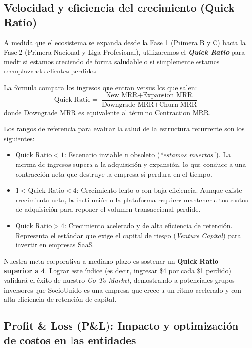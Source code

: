 \subsection{Velocidad y eficiencia del crecimiento (Quick Ratio)}

A medida que el ecosistema se expanda desde la Fase 1 (Primera B y C) hacia la Fase 2 (Primera Nacional y Liga Profesional), utilizaremos el \textbf{\textit{Quick Ratio}} para medir si estamos creciendo de forma saludable o si simplemente estamos reemplazando clientes perdidos.

La fórmula compara los ingresos que entran versus los que salen:
\begin{equation}
    \text{Quick Ratio} = \frac{\text{New MRR} + \text{Expansion MRR}}{\text{Downgrade MRR} + \text{Churn MRR}}
\end{equation}
donde $\text{Downgrade MRR}$ es equivalente al término $\text{Contraction MRR}$. 

Los rangos de referencia para evaluar la salud de la estructura recurrente son los siguientes:
\begin{itemize}
    \item $\text{Quick Ratio} < 1$: Escenario inviable u obsoleto (\textit{``estamos muertos''}). La merma de ingresos supera a la adquisición y expansión, lo que conduce a una contracción neta que destruye la empresa si perdura en el tiempo.
    \item $1 < \text{Quick Ratio} < 4$: Crecimiento lento o con baja eficiencia. Aunque existe crecimiento neto, la institución o la plataforma requiere mantener altos costos de adquisición para reponer el volumen transaccional perdido.
    \item $\text{Quick Ratio} > 4$: Crecimiento acelerado y de alta eficiencia de retención. Representa el estándar que exige el capital de riesgo (\textit{Venture Capital}) para invertir en empresas SaaS.
\end{itemize}
Nuestra meta corporativa a mediano plazo es sostener un \textbf{Quick Ratio superior a 4}. Lograr este índice (es decir, ingresar \$4 por cada \$1 perdido) validará el éxito de nuestro \textit{Go-To-Market}, demostrando a potenciales grupos inversores que SocioUnido es una empresa que crece a un ritmo acelerado y con alta eficiencia de retención de capital.

\newpage

\subsection{Profit \& Loss (P\&L): Impacto y optimización de costos en las entidades}

